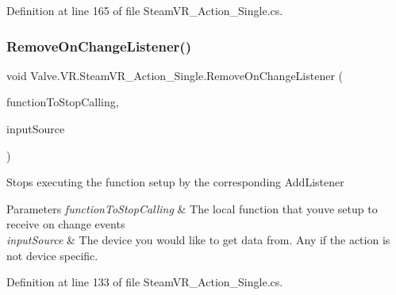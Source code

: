 Definition at line 165 of file Steam\+V\+R\+\_\+\+Action\+\_\+\+Single.\+cs.

\mbox{\label{class_valve_1_1_v_r_1_1_steam_v_r___action___single_a4f3b457d103cf2fa28d805a274977b85}} 
\subsubsection{\texorpdfstring{RemoveOnChangeListener()}{RemoveOnChangeListener()}}
{\footnotesize\ttfamily void Valve.\+V\+R.\+Steam\+V\+R\+\_\+\+Action\+\_\+\+Single.\+Remove\+On\+Change\+Listener (\begin{DoxyParamCaption}\item[{\mbox{\hyperlink{class_valve_1_1_v_r_1_1_steam_v_r___action___single_ae0c72c83dccd88a0235e8a831d62116e}{Change\+Handler}}}]{function\+To\+Stop\+Calling,  }\item[{\mbox{\hyperlink{namespace_valve_1_1_v_r_a82e5bf501cc3aa155444ee3f0662853f}{Steam\+V\+R\+\_\+\+Input\+\_\+\+Sources}}}]{input\+Source }\end{DoxyParamCaption})}



Stops executing the function setup by the corresponding Add\+Listener 


\begin{DoxyParams}{Parameters}
{\em function\+To\+Stop\+Calling} & The local function that you\textquotesingle{}ve setup to receive on change events\\
\hline
{\em input\+Source} & The device you would like to get data from. Any if the action is not device specific.\\
\hline
\end{DoxyParams}


Definition at line 133 of file Steam\+V\+R\+\_\+\+Action\+\_\+\+Single.\+cs.

\mbox{\label{class_valve_1_1_v_r_1_1_steam_v_r___action___single_afde34c68d7e2d5af7fadca23e7440ccb}} 
